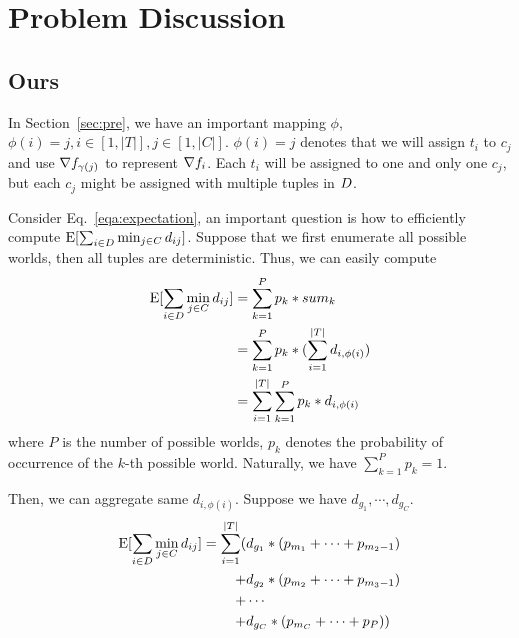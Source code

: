 





\iffalse
\section{Problem Discussion}

\subsection{Ours}

In Section~\ref{sec:pre}, we have an important mapping $\phi$, \ie $\phi(i) = j, i\in[1,|T|],  j\in[1,|C|]$. $\phi(i) = j$ denotes that we will assign  $t_i$ to $c_j$ and use $\nabla f_{\gamma(j)}$  to represent $\nabla f_i$. Each $t_i$ will be assigned to one and only one $c_j$, but each  $c_j$ might be assigned with multiple tuples in $D$. 

Consider Eq.~\ref{eqa:expectation}, an important question is how to efficiently compute $\mathrm{E}[\sum_{i\in D} \min_{j\in C} d_{ij}]$. Suppose that we first enumerate all possible worlds, then all tuples are deterministic. Thus, we can easily compute
\begin{equation}
	\label{eq:possible_worlds}
	\begin{aligned}
		\mathrm{E}[\sum_{i\in D} \min_{j\in C} d_{ij}] & = \sum_{k = 1}^{P} p_{k} * sum_k \\
		& = \sum_{k = 1}^{P} p_{k} * (\sum_{i=1}^{|T|}d_{i, \phi(i)}) \\
		& = \sum_{i=1}^{|T|} \sum_{k = 1}^{P} p_{k} * d_{i, \phi(i)} \\
	\end{aligned}
\end{equation}
where $P$ is the number of possible worlds, $p_{k}$ denotes the probability of occurrence of the $k$-th possible world. Naturally, we have $\sum_{k = 1}^{P} p_{k} = 1$.

Then,  we can aggregate same $d_{i, \phi(i)}$. Suppose we have $d_{g_1}, \cdots, d_{g_C}$. 
\begin{equation}
	\begin{aligned}
		\mathrm{E}[\sum_{i\in D} \min_{j\in C} d_{ij}] 
		 = \sum_{i=1}^{|T|} ( &
		 d_{g_1} * (p_{m_1}+\cdots+p_{{m_2} - 1})  \\
		+ & d_{g_2}* (p_{m_2}+\cdots+p_{{m_3} - 1}) \\
		+ & \cdots \\
		+ &  d_{g_C}* (p_{m_C}+\cdots+p_{P}) )
	\end{aligned}
\end{equation}


